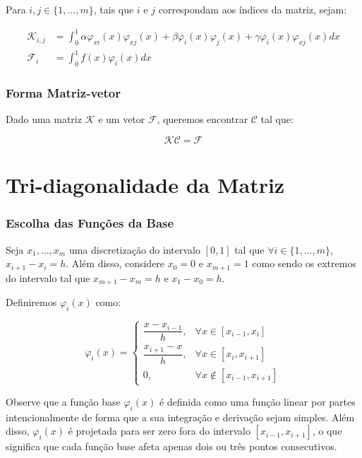\begin{frame}
  Para $i, j \in \{1,\dots,m\}$, tais que $i$ e $j$ correspondam aos índices da matriz, sejam:

  \begin{align*}
    \mathcal{K}_{i,j} &=\int_{0}^{1} \alpha  \varphi_{xi}(x) \varphi_{xj}(x) + \beta \varphi_i(x) \varphi_j(x) + \gamma  \varphi_i(x) \varphi_{xj}(x)dx \\
    \mathcal{F}_i &= \int_{0}^{1} f(x) \varphi_i(x) dx
  \end{align*}
\end{frame}

\begin{frame}
  \frametitle{Forma Matriz-vetor}

  Dado uma matriz $\mathcal{K}$ e um vetor $\mathcal{F}$, queremos encontrar $\mathcal{C}$ tal que:

  \[\mathcal{K}\mathcal{C} = \mathcal{F}\]

\end{frame}

\section{Tri-diagonalidade da Matriz}
\begin{frame}
  \frametitle{Escolha das Funções da Base}

  Seja $x_1, \dots, x_m$ uma discretização do intervalo $[0, 1]$ tal que $\forall i \in \{1, \dots, m\}$, $x_{i+1} - x_{i} = h$. Além disso, considere $x_0 = 0$ e $x_{m+1} = 1$ como sendo os extremos do intervalo tal que $x_{m+1} - x_m = h$ e $x_1 - x_0 = h$.

  Definiremos $\varphi_i(x)$ como:

  \[\varphi_i(x) = \begin{cases}
    \dfrac{x - x_{i-1}}{h}, &\forall x \in [x_{i-1}, x_i] \\
    \dfrac{x_{i+1} - x}{h}, &\forall x \in [x_{i}, x_{i+1}] \\
    0 , &\forall x \notin [x_{i-1}, x_{i+1}]
  \end{cases}\]

  Observe que a função base $\varphi_i(x)$ é definida como uma função linear por partes intencionalmente de forma que a sua integração e derivação sejam simples. Além disso, $\varphi_i(x)$ é projetada para ser zero fora do intervalo $[x_{i-1},x_{i+1}]$, o que significa que cada função base afeta apenas dois ou três pontos consecutivos.
\end{frame}

